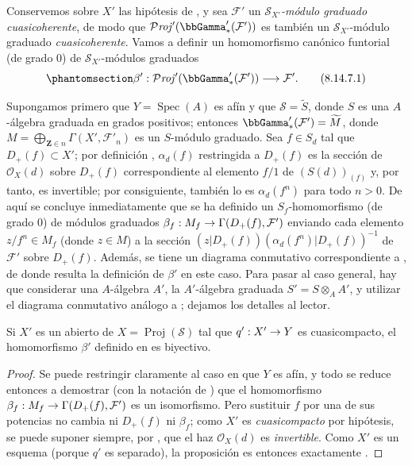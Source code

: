\documentclass[oneside,10pt]{amsart}
\makeatletter
\newcommand{\ega@arrow}[2]{\mathchoice{#1}{#2}{#2}{#2}}
\renewcommand{\to}{\ega@arrow{\longrightarrow}{\rightarrow}}
\newcommand{\oldpage}[2][]{\marginnote{\normalfont\footnotesize\textbf{#1}~|~#2}\ignorespaces}
\let\EGAOriginalLabel\label
\renewcommand{\label}[1]{\phantomsection\EGAOriginalLabel{#1}}
\makeatother
\begin{document}
\begin{env}[8.14.7]
\label{II.8.14.7-fr}
Conservemos sobre $X'$ las hipótesis de , y sea $\mathcal{F}'$ un \emph{$\mathcal{S}_{X'}$-módulo graduado cuasicoherente}, de modo que $\mathcal{P}\mathit{roj}'(\bbGamma'_*(\mathcal{F}'))$ es también un $\mathcal{S}_{X'}$-módulo graduado \emph{cuasicoherente}.
\oldpage[II]{200}
Vamos a definir un homomorfismo canónico funtorial (de grado $0$) de $\mathcal{S}_{X'}$-módulos graduados
\begin{equation}
\label{II.8.14.7.1-fr}
  \beta':\mathcal{P}\mathit{roj}'(\bbGamma'_*(\mathcal{F}'))\to\mathcal{F}'.
\tag{8.14.7.1}
\end{equation}

Supongamos primero que $Y=\operatorname{Spec}(A)$ es afín y que $\mathcal{S}=\widetilde{S}$, donde $S$ es una $A$-álgebra graduada en grados positivos;
entonces $\bbGamma'_*(\mathcal{F}')=\widetilde{M}$, donde $M=\bigoplus_{\mathbf{Z}\in n}\Gamma(X',\mathcal{F}'_n)$ es un $S$-módulo graduado.
Sea $f\in S_d$ tal que $D_+(f)\subset X'$;
por definición , $\alpha_d(f)$ restringida a $D_+(f)$ es la sección de $\mathcal{O}_X(d)$ sobre $D_+(f)$ correspondiente al elemento $f/1$ de $(S(d))_{(f)}$ y, por tanto, es invertible;
por consiguiente, también lo es $\alpha_d(f^n)$ para todo $n>0$.
De aquí se concluye inmediatamente que se ha definido un $S_f$-homomorfismo (de grado $0$) de módulos graduados $\beta_f:M_f\to\Gamma(D_+(f),\mathcal{F}')$ enviando cada elemento $z/f^n\in M_f$ (donde $z\in M$) a la sección $(z|D_+(f))(\alpha_d(f^n)|D_+(f))^{-1}$ de $\mathcal{F}'$ sobre $D_+(f)$.
Además, se tiene un diagrama conmutativo correspondiente a , de donde resulta la definición de $\beta'$ en este caso.
Para pasar al caso general, hay que considerar una $A$-álgebra $A'$, la $A'$-álgebra graduada $S'=S\otimes_A A'$, y utilizar el diagrama conmutativo análogo a ;
dejamos los detalles al lector.
\end{env}

\begin{proposition}[8.14.8]
\label{II.8.14.8-fr}
Si $X'$ es un abierto de $X=\operatorname{Proj}(\mathcal{S})$ tal que $q':X'\to Y$ es cuasicompacto, el homomorfismo $\beta'$ definido en \textup{} es biyectivo.
\end{proposition}

\begin{proof}
Se puede restringir claramente al caso en que $Y$ es afín, y todo se reduce entonces a demostrar (con la notación de ) que el homomorfismo $\beta_f:M_f\to\Gamma(D_+(f),\mathcal{F}')$ es un isomorfismo.
Pero sustituir $f$ por una de sus potencias no cambia ni $D_+(f)$ ni $\beta_f$;
como $X'$ es \emph{cuasicompacto} por hipótesis, se puede suponer siempre, por , que el haz $\mathcal{O}_X(d)$ es \emph{invertible}.
Como $X'$ es un esquema (porque $q'$ es separado), la proposición es entonces exactamente .
\end{proof}
\end{document}
